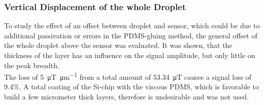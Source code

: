 \subsubsection{Vertical Displacement of the whole Droplet}
To study the effect of an offset between droplet and sensor, which could be due to additional passivation or errors in the PDMS-gluing method, the general offset of the whole droplet above the sensor was evaluated. It was shown, that the thickness of the layer has an influence on the signal amplitude, but only little on the peak breadth.\\
The loss of \SI{5}{\micro\tesla\per\micro\meter} from a total amount of  \SI{53.34}{\micro\tesla} causes a signal loss of 9.4\%. A total coating of the Si-chip with the viscous PDMS, which is favorable to build a few micrometer thick layers, therefore is undesirable and was not used.



